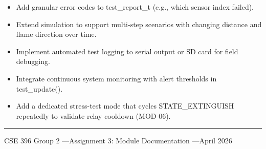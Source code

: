 \documentclass[12pt,a4paper]{article}
\newcommand{\fn}[1]{{\footnotesize\ttfamily #1}}
\begin{document}
\begin{itemize}[leftmargin=1.5em]
  \item[$\square$] Add granular error codes to \fn{test\_report\_t} (e.g., which sensor index failed).
  \item[$\square$] Extend simulation to support multi-step scenarios with changing distance and flame direction over time.
  \item[$\square$] Implement automated test logging to serial output or SD card for field debugging.
  \item[$\square$] Integrate continuous system monitoring with alert thresholds in \fn{test\_update()}.
  \item[$\square$] Add a dedicated stress-test mode that cycles \fn{STATE\_EXTINGUISH} repeatedly to validate relay cooldown (MOD-06).
\end{itemize}


\vfill
{\color{accent}\rule{\linewidth}{1.5pt}}
\begin{center}
  \small
  CSE 396 Group 2 \quad---\quad Assignment 3: Module Documentation \quad---\quad April 2026
\end{center}
\end{document}
